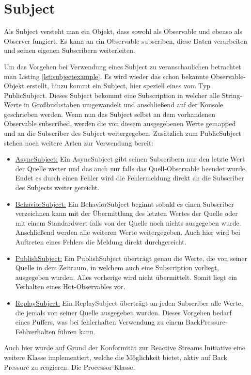 \section{Subject}
Als Subject versteht man ein Objekt, dass sowohl als Observable und ebenso als Observer fungiert. Es kann an ein Observable subscriben, diese Daten verarbeiten und seinen eigenen Subscribern weiterleiten. 

Um das Vorgehen bei Verwendung eines Subject zu veranschaulichen betrachtet man 
Listing \ref{lst:subjectexample}. Es wird wieder das schon bekannte 
Observable-Objekt erstellt, hinzu kommt ein Subject, hier speziell eines vom Typ 
PublicSubject. Dieses Subject bekommt eine Subscription in welcher alle 
String-Werte in Großbuchstaben umgewandelt und anschließend auf der Konsole 
geschrieben werden. Wenn nun das Subject selbst an dem vorhandenen Observable 
subscribed, werden die von diesem ausgegebenen Werte gemapped und an die 
Subscriber des Subject weitergegeben. Zusätzlich zum PublicSubject stehen noch 
weitere Arten zur Verwendung bereit:
\begin{itemize}
	\item \underline{AsyncSubject:} Ein AsyncSubject gibt seinen Subscribern nur den letzte Wert der Quelle weiter und das auch nur falls das Quell-Observable beendet wurde. Endet es durch einen Fehler wird die Fehlermeldung direkt an die Subscriber des Subjects weiter gereicht.
	\item \underline{BehaviorSubject:} Ein BehaviorSubject beginnt sobald es einen Subscriber verzeichnen kann mit der Übermittlung des letzten Wertes der Quelle oder mit einem Standardwert falls von der Quelle noch nichts ausgegeben wurde. Anschließend werden alle weiteren Werte weitergegeben. Auch hier wird bei Auftreten eines Fehlers die Meldung direkt durchgereicht.
	\item \underline{PublishSubject:} Ein PublishSubject überträgt genau die Werte, die von seiner Quelle in dem Zeitraum, in welchem auch eine Subscription vorliegt, ausgegeben wurden. Alles vorherige wird nicht übermittelt. Somit liegt ein Verhalten eines Hot-Observables vor.
	\item \underline{ReplaySubject:} Ein ReplaySubject überträgt an jeden Subscriber alle Werte, die jemals von seiner Quelle ausgegeben wurden. Dieses Vorgehen bedarf eines Puffers, was bei fehlerhaften Verwendung zu einem BackPressure-Fehlverhalten führen kann. 
\end{itemize}
Auch hier wurde auf Grund der Konformität zur Reactive Streams Initiative eine weitere Klasse implementiert, welche die Möglichkeit bietet, aktiv auf Back Pressure zu reagieren. Die Processor-Klasse.

